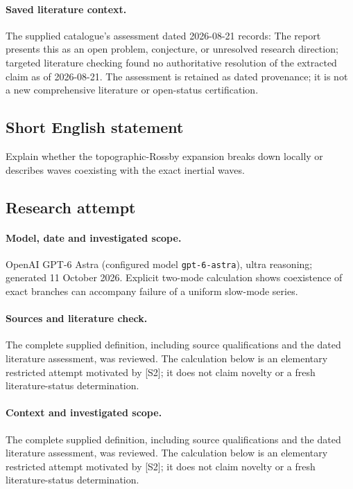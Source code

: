 \documentclass[11pt]{article}
\begin{document}
\paragraph{Saved literature context.} The supplied catalogue's assessment dated 2026-08-21 records: The report presents this as an open problem, conjecture, or unresolved research direction; targeted literature checking found no authoritative resolution of the extracted claim as of 2026-08-21. The assessment is retained as dated provenance; it is not a new comprehensive literature or open-status certification.
\subsection{Short English statement}
Explain whether the topographic-Rossby expansion breaks down locally or describes waves coexisting with the exact inertial waves.
\subsection{Research attempt}
\paragraph{Model, date and investigated scope.}
OpenAI GPT-6 Astra (configured model \texttt{gpt-6-astra}), ultra reasoning; generated 11 October 2026. Explicit two-mode calculation shows coexistence of exact branches can accompany failure of a uniform slow-mode series.

\paragraph{Sources and literature check.}
The complete supplied definition, including source qualifications and the dated literature assessment, was reviewed. The calculation below is an elementary restricted attempt motivated by [S2]; it does not claim novelty or a fresh literature-status determination.

\paragraph{Context and investigated scope.} The complete supplied definition, including source qualifications and the dated literature assessment, was reviewed. The calculation below is an elementary restricted attempt motivated by [S2]; it does not claim novelty or a fresh literature-status determination.
\end{document}
